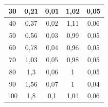 \documentclass[a4paper, 12pt]{article}%
\begin{document}
\begin{table}[h!]
\begin{center}
\begin{tabular}{|c|c|c|c|c|}
30             & 0,21                                            & 0,01                                                                   & 1,02                                                            & 0,05                                                                     \\ \hline
40             & 0,37                                            & 0,02                                                                   & 1,11                                                            & 0,06                                                                     \\ \hline
50             & 0,56                                            & 0,03                                                                   & 0,99                                                            & 0,05                                                                     \\ \hline
60             & 0,78                                            & 0,04                                                                   & 0,96                                                            & 0,05                                                                     \\ \hline
70             & 1,03                                            & 0,05                                                                   & 0,98                                                            & 0,05                                                                     \\ \hline
80             & 1,3                                             & 0,06                                                                   & 1                                                               & 0,05                                                                     \\ \hline
90             & 1,56                                            & 0,07                                                                   & 1                                                               & 0,04                                                                     \\ \hline
100            & 1,8                                             & 0,1                                                                    & 1,01                                                            & 0,06                                                                     \\ \hline

\end{tabular}
\end{center}
\end{table}
\end{document}
